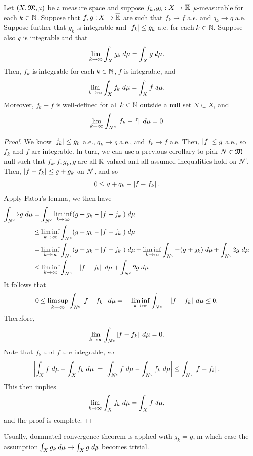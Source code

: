 \documentclass[a4paper]{article}
\begin{document}
\begin{thm}
Let $(X, \mathfrak{M}, \mu)$ be a measure space and suppose
$f_k, g_k : X \to \overline{\mathbb{R}}$ $\mu$-measurable for each
$k \in \mathbb{N}$. Suppose that $f, g: X \to \overline{\mathbb{R}}$ are such that
$f_k \to f$ a.e. and $g_k \to g$ a.e. Suppose further that
$g_k$ is integrable and $\left\lvert f_k\right\rvert \leq g_k$ a.e.
for each $k \in \mathbb{N}$. Suppose also $g$ is integrable and that
\[
\lim_{k \to \infty} \int_X g_k \; d \mu =
\int_X g \; d \mu.
\]
Then, $f_k$ is integrable for each $k \in \mathbb{N}$,
$f$ is integrable, and
\[
\lim_{k \to \infty} \int_X f_k \; d \mu = \int_X f \; d \mu.
\]
Moreover, $f_k - f$ is well-defined for all $k \in \mathbb{N}$
outside a null set $N \subset X$, and
\[
\lim_{k \to \infty} \int_{N^c} \left\lvert f_k - f\right\rvert \; d \mu = 0
\]
\end{thm}

\begin{proof}
We know $\left\lvert f_k\right\rvert \leq g_k$ a.e., $g_k \to g$ a.e.,
and $f_k \to f$ a.e. Then, $\left\lvert f\right\rvert \leq g$ a.e.,
so $f_k$ and $f$ are integrable.
In turn, we can use a previous corollary to pick $N \in \mathfrak{M}$
null such that $f_k, f, g_k, g$ are all $\mathbb{R}$-valued
and all assumed inequalities hold on $N^c$.
Then, $\left\lvert f - f_k\right\rvert \leq g + g_k$ on $N^c$, and so
\[
0 \leq g + g_k - \left\lvert f - f_k\right\rvert.
\]
Apply Fatou's lemma, we then have
\[
\begin{aligned}
\int_{N^c} 2g \; d \mu
&= \int_{N^c} \liminf_{k \to \infty} (g + g_k - \left\lvert f - f_k\right\rvert)
\; d \mu  \\
&\leq \liminf_{k \to \infty} \int_{N^c} (g + g_k - \left\lvert f - f_k\right\rvert)
\; d \mu \\
&= \liminf_{k \to \infty} \int_{N^c} (g + g_k - \left\lvert f - f_k\right\rvert)
\; d \mu + \liminf_{k \to \infty} \int_{N^c} -(g + g_k) \; d \mu
+ \int_{N^c} 2g \; d \mu \\
&\leq \liminf_{k \to \infty} \int_{N^c} - \left\lvert f - f_k\right\rvert \; d \mu
+ \int_{N^c} 2g \; d \mu.
\end{aligned}
\]
It follows that
\[
0 \leq \limsup_{k \to \infty} \int_{N^c} \left\lvert f - f_k\right\rvert \; d \mu
= - \liminf_{k \to \infty} \int_{N^c} - \left\lvert f - f_k\right\rvert \; d \mu
\leq 0.
\]
Therefore,
\[
\lim_{k \to \infty} \int_{N^c} \left\lvert f - f_k\right\rvert \; d \mu = 0.
\]
Note that $f_k$ and $f$ are integrable, so
\[
\left\lvert \int_X f \; d \mu - \int_X f_k \; d \mu\right\rvert
= \left\lvert \int_{N^c} f \; d \mu - \int_{N^c} f_k \; d \mu\right\rvert
\leq \int_{N^c} \left\lvert f - f_k\right\rvert.
\]
This then implies
\[
\lim_{k \to \infty} \int_X f_k \; d \mu = \int_X f \; d \mu,
\]
and the proof is complete.
\end{proof}

\begin{remark}
Usually, dominated convergence theorem is applied with
$g_k = g$, in which case the assumption
$\int_X g_k \; d \mu \to \int_X g \; d \mu$ becomes trivial.
\end{remark}
\end{document}
